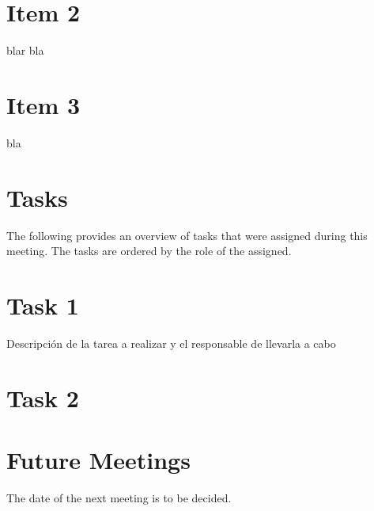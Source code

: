 \documentclass[12pt, a4paper]{article}
\begin{document}
\section{Item 2}
blar bla
\section{Item 3}
bla 
\section*{Tasks}
The following provides an overview of tasks that were assigned during this meeting. The tasks are ordered by the role of the assigned.
\setcounter{section}{0}
\section{Task 1} %
Descripción de la tarea a realizar y el responsable de llevarla a cabo
\section{Task 2}
\section*{Future Meetings} %
The date of the next meeting is to be decided.
\end{document}
